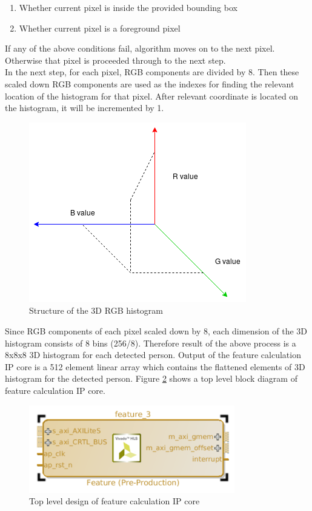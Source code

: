 \documentclass[12pt,a4paper]{report}
\begin{document}
\begin{enumerate}
\item Whether current pixel is inside the provided bounding box
\item Whether current pixel is a foreground pixel
\end{enumerate}
If any of the above conditions fail, algorithm moves on to the next pixel. Otherwise that pixel is proceeded through to the next step.\\
In the next step, for each pixel, RGB components are divided by 8. Then these scaled down RGB components are used as the indexes for finding the relevant location of the histogram for that pixel. After relevant coordinate is located on the histogram, it will be incremented by 1.
\begin{figure}[H]
\includegraphics[width=\textwidth]{test.png}
\centering
\caption{Structure of the 3D RGB histogram}
\label{hist}
\end{figure}

Since RGB components of each pixel scaled down by 8, each dimension of the 3D histogram consists of 8 bins (256/8). Therefore result of the above process is a 8x8x8 3D histogram for each detected person. Output of the feature calculation IP core is a 512 element linear array which contains the flattened elements of 3D histogram for the detected person. Figure \ref{featureip} shows a top level block diagram of feature calculation IP core. 
\begin{figure}[H]
\includegraphics[width=0.8\textwidth]{featureip}
\centering
\caption{Top level design of feature calculation IP core}
\label{featureip}
\end{figure}
\end{document}
